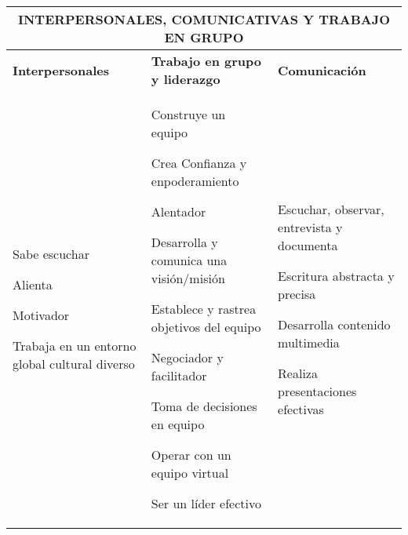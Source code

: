 \begin{center}
\begin{tabularx}{\textwidth}{|X|X|X|} \hline
\multicolumn{3}{|c|}{\textbf{INTERPERSONALES, COMUNICATIVAS Y TRABAJO EN GRUPO}} \\ \hline
\textbf{Interpersonales} & \textbf{Trabajo en grupo y liderazgo} & \textbf{Comunicación} \\ \hline

\begin{capenv}
\item Sabe escuchar
\item Alienta
\item Motivador
\item Trabaja en un entorno global cultural diverso
\end{capenv}
&
\begin{capenv}
\item Construye un equipo
\item Crea Confianza y enpoderamiento
\item Alentador
\item Desarrolla y comunica una visión/misión
\item Establece y rastrea objetivos del equipo
\item Negociador y facilitador
\item Toma de decisiones en equipo
\item Operar con un equipo virtual
\item Ser un lí­der efectivo
\end{capenv}
&
\begin{capenv}
\item Escuchar, observar, entrevista y documenta
\item Escritura abstracta y precisa
\item Desarrolla contenido multimedia
\item Realiza presentaciones efectivas
\end{capenv} \\ \hline

\end{tabularx}
\end{center}

